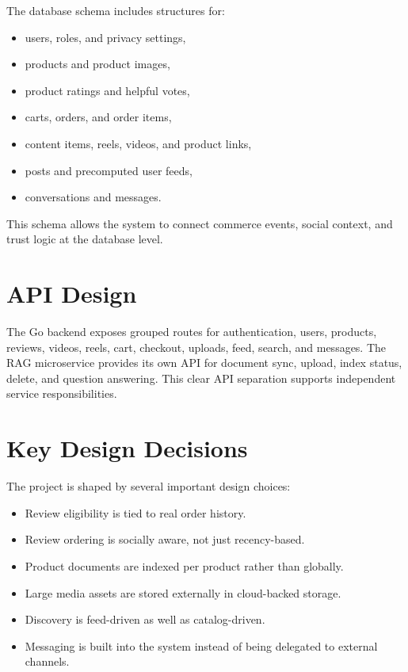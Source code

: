 \documentclass[12pt,letterpaper]{report}
\begin{document}
The database schema includes structures for:

\begin{itemize}
  \item users, roles, and privacy settings,
  \item products and product images,
  \item product ratings and helpful votes,
  \item carts, orders, and order items,
  \item content items, reels, videos, and product links,
  \item posts and precomputed user feeds,
  \item conversations and messages.
\end{itemize}

This schema allows the system to connect commerce events, social context, and trust logic at the database level.

\section{API Design}

The Go backend exposes grouped routes for authentication, users, products, reviews, videos, reels, cart, checkout, uploads, feed, search, and messages. The RAG microservice provides its own API for document sync, upload, index status, delete, and question answering. This clear API separation supports independent service responsibilities.

\section{Key Design Decisions}

The project is shaped by several important design choices:

\begin{itemize}
  \item Review eligibility is tied to real order history.
  \item Review ordering is socially aware, not just recency-based.
  \item Product documents are indexed per product rather than globally.
  \item Large media assets are stored externally in cloud-backed storage.
  \item Discovery is feed-driven as well as catalog-driven.
  \item Messaging is built into the system instead of being delegated to external channels.
\end{itemize}
\end{document}
